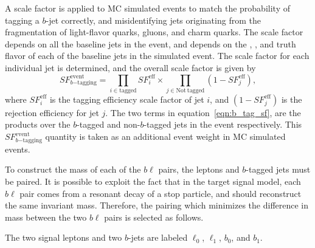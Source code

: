 A scale factor is applied to MC simulated events to match the probability of
tagging a $b$-jet correctly, and misidentifying jets originating from the
fragmentation of light-flavor quarks, gluons, and charm quarks. 
The scale factor depends on all the baseline jets in the event, and depends
on the \et, \eta, and truth flavor of each of the baseline jets in the
simulated event.
The scale factor for each individual jet is determined, and the overall
scale factor is given by
\begin{equation}
  \label{eqn:b_tag_sf}
  SF_{b\mathrm{-tagging}}^\mathrm{event} =
  \prod_{i \in \mathrm{tagged}}
  SF_i^\mathrm{eff}
  \times
  \prod_{j \in \mathrm{Not~tagged}}
  (1- SF_j^\mathrm{eff}),
\end{equation}
where $SF_i^\mathrm{eff}$ is the tagging efficiency scale factor of jet $i$, and
$(1- SF_j^\mathrm{eff})$
is the rejection efficiency for jet $j$.
The two terms in equation~\ref{eqn:b_tag_sf}, are the products over the
$b$-tagged and non-$b$-tagged jets in the event respectively.
This $SF_{b\mathrm{-tagging}}^\mathrm{event}$ quantity is taken as an additional
event weight in MC simulated events.

To construct the mass of each of the $b\ell$ pairs, the leptons and $b$-tagged
jets must be paired.
It is possible to exploit the fact that in the target signal model, each
$b\ell$ pair comes from a resonant decay of a stop particle, and should
reconstruct the same invariant mass.
Therefore, the pairing which minimizes the difference in mass between the two
$b\ell$ pairs is selected as follows.

The two signal leptons and two $b$-jets are labeled $\ell_0$, $\ell_1$, $b_0$,
and $b_1$.

